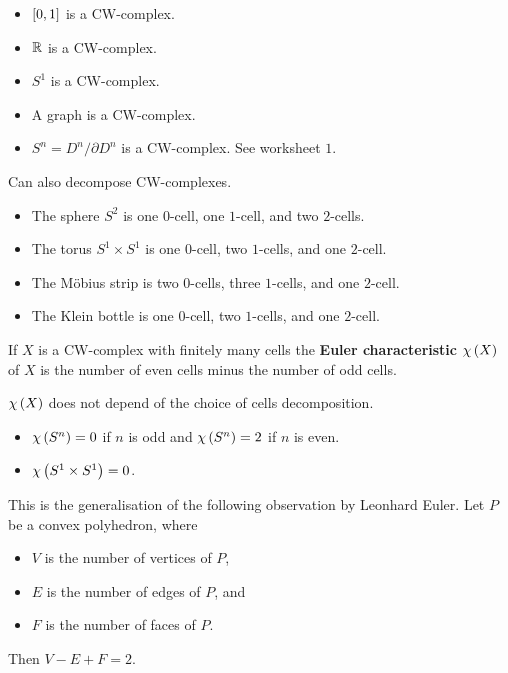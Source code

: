\begin{example*}
\hfill
\begin{itemize}
\item $ \sb{0, 1} $ is a CW-complex.
\item $ \R $ is a CW-complex.
\item $ S^1 $ is a CW-complex.
\item A graph is a CW-complex.
\item $ S^n = D^n / \partial D^n $ is a CW-complex. See worksheet $ 1 $.
\end{itemize}
Can also decompose CW-complexes.
\begin{itemize}
\item The sphere $ S^2 $ is one $ 0 $-cell, one $ 1 $-cell, and two $ 2 $-cells.
\item The torus $ S^1 \times S^1 $ is one $ 0 $-cell, two $ 1 $-cells, and one $ 2 $-cell.
\item The M\"obius strip is two $ 0 $-cells, three $ 1 $-cells, and one $ 2 $-cell.
\item The Klein bottle is one $ 0 $-cell, two $ 1 $-cells, and one $ 2 $-cell.
\end{itemize}
\end{example*}

\begin{definition*}
If $ X $ is a CW-complex with finitely many cells the \textbf{Euler characteristic} $ \chi\rb{X} $ of $ X $ is the number of even cells minus the number of odd cells.
\end{definition*}

\begin{fact*}
$ \chi\rb{X} $ does not depend of the choice of cells decomposition.
\end{fact*}

\begin{example*}
\hfill
\begin{itemize}
\item $ \chi\rb{S^n} = 0 $ if $ n $ is odd and $ \chi\rb{S^n} = 2 $ if $ n $ is even.
\item $ \chi\rb{S^1 \times S^1} = 0 $.
\end{itemize}
\end{example*}

This is the generalisation of the following observation by Leonhard Euler. Let $ P $ be a convex polyhedron, where
\begin{itemize}
\item $ V $ is the number of vertices of $ P $,
\item $ E $ is the number of edges of $ P $, and
\item $ F $ is the number of faces of $ P $.
\end{itemize}
Then $ V - E + F = 2 $.

